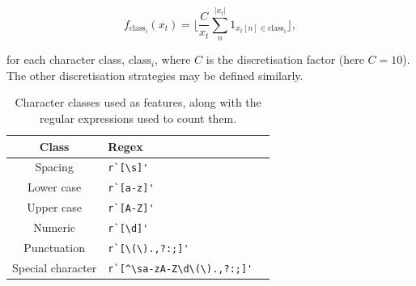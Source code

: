 \begin{equation}
f_{\text{class}_i}(x_t) = \Bigg\lfloor \frac{C}{x_t}\sum_n^{|x_t|} 1_{x_t[n] \in \text{class}_i} \Bigg\rfloor,
\label{eq:classfunctions}
\end{equation}

for each character class, $\text{class}_i$, where $C$ is the discretisation factor (here $C = 10$). The other discretisation strategies may be defined similarly.

\begin{table}[h]
\begin{center}
\begin{tabular}{|c|l|l|}
\hline
Class & Regex\\
\hline
Spacing & \verb|r`[\s]'|\\
Lower case & \verb|r`[a-z]'|\\
Upper case & \verb|r`[A-Z]'|\\
Numeric & \verb|r`[\d]'|\\
Punctuation & \verb|r`[\(\).,?:;]'|\\
Special character & \verb|r`[^\sa-zA-Z\d\(\).,?:;]'|\\
\hline
\end{tabular}
\caption[Character classes used as features, along with the regular expressions used to count them.]{Character classes used as features, along with the regular expressions used to count them.}
\label{table:characterclasses}
\end{center}
\end{table}

